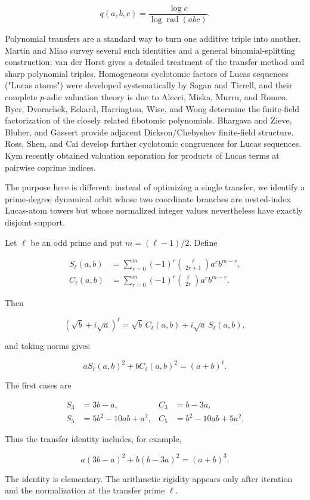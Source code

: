 \documentclass[11pt]{article}
\begin{document}
\[
q(a,b,c)=\frac{\log c}{\log\operatorname{rad}(abc)}.
\]

Polynomial transfers are a standard way to turn one additive triple into
another. Martin and Miao survey several such identities and a general
binomial-splitting construction; van der Horst gives a detailed treatment
of the transfer method and sharp polynomial triples. Homogeneous
cyclotomic factors of Lucas sequences ("Lucas atoms") were developed
systematically by Sagan and Tirrell, and their complete \(p\)-adic
valuation theory is due to Alecci, Miska, Murru, and Romeo. Byer,
Dvorachek, Eckard, Harrington, Wise, and Wong determine the finite-field
factorization of the closely related fibotomic polynomials. Bhargava and
Zieve, Bluher, and Gassert provide adjacent Dickson/Chebyshev finite-field
structure. Ross, Shen, and Cai develop further cyclotomic congruences for
Lucas sequences. Kym recently obtained valuation separation for products
of Lucas terms at pairwise coprime indices.

The purpose here is different: instead of optimizing a single transfer, we
identify a prime-degree dynamical orbit whose two coordinate branches are
nested-index Lucas-atom towers but whose normalized integer values
nevertheless have exactly disjoint support.

Let \(\ell\) be an odd prime and put \(m=(\ell-1)/2\). Define

\[
\begin{aligned}
S_\ell(a,b)
&=
\sum_{r=0}^{m}
(-1)^r
\binom{\ell}{2r+1}
a^r b^{m-r},\\
C_\ell(a,b)
&=
\sum_{r=0}^{m}
(-1)^r
\binom{\ell}{2r}
a^r b^{m-r}.
\end{aligned}
\]

Then

\[
(\sqrt b+i\sqrt a)^\ell
=
\sqrt b\,C_\ell(a,b)
+i\sqrt a\,S_\ell(a,b),
\]

and taking norms gives

\[
aS_\ell(a,b)^2+bC_\ell(a,b)^2=(a+b)^\ell.
\]

The first cases are

\[
\begin{aligned}
S_3&=3b-a,
&
C_3&=b-3a,\\
S_5&=5b^2-10ab+a^2,
&
C_5&=b^2-10ab+5a^2.
\end{aligned}
\]

Thus the transfer identity includes, for example,

\[
a(3b-a)^2+b(b-3a)^2=(a+b)^3.
\]

The identity is elementary. The arithmetic rigidity appears only after
iteration and the normalization at the transfer prime \(\ell\).
\end{document}

